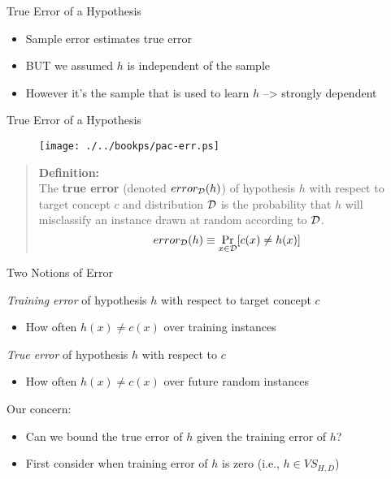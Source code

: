 \documentclass[%
pdf,
colorBG,
slideColor,
tcrico,
]{prosper}
\begin{document}


\begin{slide}{True Error of a Hypothesis }
\begin{itemize}
 \item Sample error estimates true error
 \item BUT we assumed $h$ is independent of the sample
\item However it's the sample that is used to learn $h$ --> strongly dependent
\end{itemize}

\end{slide}



\begin{slide}{True Error of a Hypothesis }
\tiny 
\begin{figure}
		\centering
		\texttt{[image: ./../bookps/pac-err.ps]}
	\end{figure}

\begin{quote}
{\bf Definition:} 
\\ 
The {\bf true error} (denoted $error_{\cal{D}}(h)$) of
hypothesis $h$ with respect to target concept $c$ and distribution $\cal{D}$
is the probability that $h$ will misclassify an instance drawn at random
according to $\cal{D}$.
\[error_{\cal{D}}(h) \equiv \Pr_{x \in \cal{D}}[c(x) \neq h(x)] \]

\end{quote}
\end{slide}



\begin{slide}{Two Notions of Error }

{\em Training error} of hypothesis $h$ with respect to target concept $c$
\begin{itemize}
\item How often $h(x) \neq c(x)$ over training instances
\end{itemize}


{\em True error} of hypothesis $h$ with respect to $c$
\begin{itemize}
\item How often $h(x) \neq c(x)$ over future random instances
\end{itemize}


Our concern: 
\begin{itemize}
\item Can we bound the  true error of $h$ given the training error of
$h$?

\item First consider when training error of $h$ is zero (i.e., $h \in VS_{H,D}$)
\end{itemize}
\end{slide}
\end{document}
